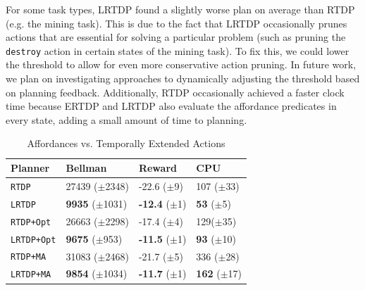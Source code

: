 \documentclass[letterpaper]{article}
\newcommand{\stnote}[1]{\textcolor{Blue}{\textbf{stefie10: #1}}}
\newcommand{\ra}[1]{\renewcommand{\arraystretch}{#1}} %
\begin{document}
For some task types, LRTDP found a slightly worse plan on average than
RTDP (e.g. the mining task). This is due to the fact that LRTDP
occasionally prunes actions that are essential for solving a particular problem (such as
pruning the \texttt{destroy} action in certain states of the mining task).
To fix this, we could lower the threshold to allow for even more conservative action pruning. In future work, we plan on investigating approaches
to dynamically adjusting the threshold based on planning feedback. Additionally, RTDP occasionally achieved a faster clock time because ERTDP and LRTDP also evaluate the affordance predicates in every state, adding a small amount of time to planning.



\begin{table}[b]
\ra{1.1}
\small
\begin{tabular}{@{}llll@{}}\toprule
Planner & Bellman & Reward & CPU \\ \midrule
\texttt{RTDP}   			&	27439 ($\pm$2348)		&	-22.6 ($\pm$9)		& 107 ($\pm$33) \\
\texttt{LRTDP} 			& 	{\bf 9935} ($\pm$1031)	&	{\bf -12.4} ($\pm$1)& {\bf 53} ($\pm$5) \\ \hline
\texttt{RTDP+Opt}  		&	26663 ($\pm$2298)		&	-17.4 ($\pm$4) 		& 129($\pm$35) \\
\texttt{LRTDP+Opt} 		& 	{\bf 9675} ($\pm$953)	&	{\bf -11.5} ($\pm$1)	&{\bf 93} ($\pm$10) \\ \hline
\texttt{RTDP+MA}  		&	31083 ($\pm$2468)		&	-21.7	 ($\pm$5)		&336 ($\pm$28) \\
\texttt{LRTDP+MA}  		& 	{\bf 9854} ($\pm$1034)	&	{\bf -11.7} ($\pm$1)	&{\bf 162} ($\pm$17) \\ %
\bottomrule
\end{tabular}
\caption{Affordances vs. Temporally Extended Actions}
\label{table:temp_ext_act_results}
\end{table}


\end{document}
